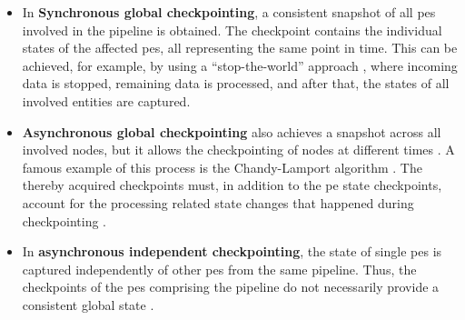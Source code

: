 \begin{itemize}
    \item In \textbf{Synchronous global checkpointing}, a consistent snapshot of all \gls{pe}s involved in the pipeline is obtained. The checkpoint contains the individual states of the affected \gls{pe}s, all representing the same point in time. This can be achieved, for example, by using a “stop-the-world” approach \cite{Murray.2013, Gibson.2014}, where incoming data is stopped, remaining data is processed, and after that, the states of all involved entities are captured.
    \item \textbf{Asynchronous global checkpointing} also achieves a snapshot across all involved nodes, but it allows the checkpointing of nodes at different times \cite{Gibson.2014}. A famous example of this process is the Chandy-Lamport algorithm \cite{Chandy.1985}. The thereby acquired checkpoints must, in addition to the \gls{pe} state checkpoints, account for the processing related state changes that happened during checkpointing \cite{Chandy.1985}.
    \item In \textbf{asynchronous independent checkpointing}, the state of single \gls{pe}s is captured independently of other \gls{pe}s from the same pipeline. Thus, the checkpoints of the \gls{pe}s comprising the pipeline do not necessarily provide a consistent global state \cite{Gibson.2014}.
\end{itemize}


